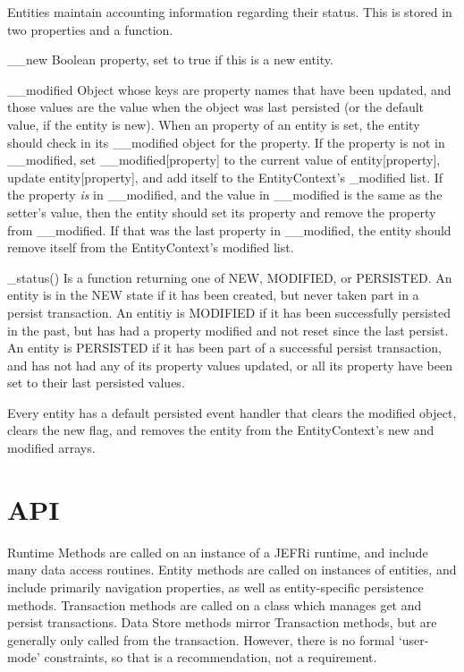 \documentclass{article}
\begin{document}
Entities maintain accounting information regarding their status. This is stored
in two properties and a function.

{\ilcode \_\_new} Boolean property, set to true if this is a new entity.

{\ilcode \_\_modified} Object whose keys are property names that have been
updated, and those values are the value when the object was last persisted (or
the default value, if the entity is new). When an property of an entity is set,
the entity should check in its {\ilcode \_\_modified} object for the property.
If the property is not in \_\_modified, set {\ilcode \_\_modified[property]} to
the current value of {\ilcode entity[property]}, update {\ilcode
entity[property]}, and add itself to the EntityContext's {\ilcode \_modified}
list. If the property {\it  is} in {\ilcode \_\_modified}, and the value in
{\ilcode \_\_modified} is the same as the setter's value, then the entity should
set its property and remove the property from \_\_modified. If that was the last
property in \_\_modified, the entity should remove itself from the
EntityContext's modified list.

{\ilcode \_status()} Is a function returning one of {\ilcode NEW}, {\ilcode
MODIFIED}, or {\ilcode PERSISTED}. An entity is in the {\ilcode NEW} state if it
has been created, but never taken part in a {\ilcode persist} transaction. An
entitiy is {\ilcode MODIFIED} if it has been successfully persisted in the past,
but has had a property modified and not reset since the last persist. An entity
is {\ilcode PERSISTED} if it has been part of a successful persist transaction,
and has not had any of its property values updated, or all its property have
been set to their last persisted values.

Every entity has a default {\ilcode persisted} event handler that clears the
modified object, clears the new flag, and removes the entity from the
EntityContext's new and modified arrays.

\section{API}

Runtime Methods are called on an instance of a JEFRi runtime, and include many
data access routines. Entity methods are called on instances of entities, and
include primarily navigation properties, as well as entity-specific persistence
methods. Transaction methods are called on a class which manages {\ilcode get}
and {\ilcode persist} transactions. Data Store methods mirror Transaction
methods, but are generally only called from the transaction. However, there is
no formal `user-mode' constraints, so that is a recommendation, not a
requirement.
\end{document}
